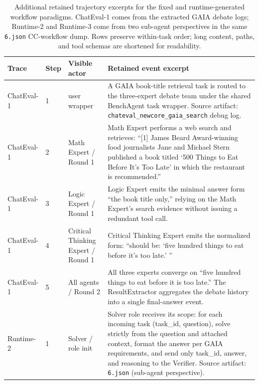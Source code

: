 \begin{table}[t]
    \centering
    \caption{Additional retained trajectory excerpts for the fixed and runtime-generated workflow paradigms. ChatEval-1 comes from the extracted GAIA debate logs; Runtime-2 and Runtime-3 come from two sub-agent perspectives in the same \texttt{6.json} CC-workflow dump. Rows preserve within-task order; long content, paths, and tool schemas are shortened for readability.}
    \label{tab:appendix_additional_trajectory_excerpts}
    \footnotesize
    \setlength{\tabcolsep}{3pt}
    \renewcommand{\arraystretch}{1.08}
    \begin{tabular}{>{\raggedright\arraybackslash}p{}p{}p{}p{}}
        \toprule
        \textbf{Trace} & \textbf{Step} & \textbf{Visible actor} & \textbf{Retained event excerpt} \\
        \midrule
        \mbox{ChatEval-1} & 1 & user wrapper & A GAIA book-title retrieval task is routed to the three-expert debate team under the shared BenchAgent task wrapper. Source artifact: \texttt{chateval\_newcore\_gaia\_search} debug log. \\
        \mbox{ChatEval-1} & 2 & Math Expert / Round 1 & Math Expert performs a web search and retrieves: ``[1] James Beard Award-winning food journalists Jane and Michael Stern published a book titled `500 Things to Eat Before It's Too Late' in which the restaurant is recommended.'' \\
        \mbox{ChatEval-1} & 3 & Logic Expert / Round 1 & Logic Expert emits the minimal answer form ``the book title only,'' relying on the Math Expert's search evidence without issuing a redundant tool call. \\
        \mbox{ChatEval-1} & 4 & Critical Thinking Expert / Round 1 & Critical Thinking Expert emits the normalized form: ``should be: `five hundred things to eat before it's too late.' '' \\
        \mbox{ChatEval-1} & 5 & All agents / Round 2 & All three experts converge on ``five hundred things to eat before it is too late.'' The ResultExtractor aggregates the debate history into a single final-answer event. \\
        \midrule
        \mbox{Runtime-2} & 1 & Solver / role init & Solver role receives its scope: for each incoming task (task\_id, question), solve strictly from the question and attached context, format the answer per GAIA requirements, and send only task\_id, answer, and reasoning to the Verifier. Source artifact: \texttt{6.json} (sub-agent perspective). \\

\end{tabular}
\end{table}
